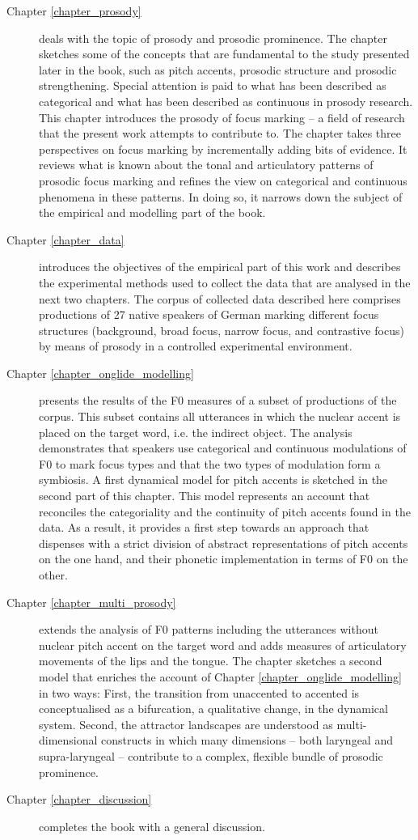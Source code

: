 \begin{description}
\item[Chapter \ref{chapter_prosody}] deals with the topic of prosody and prosodic prominence. The chapter sketches some of the concepts that are fundamental to the study presented later in the book, such as pitch accents, prosodic structure and prosodic strengthening. Special attention is paid to what has been described as categorical and what has been described as continuous in prosody research. This chapter introduces the prosody of focus marking -- a field of research that the present work attempts to contribute to. The chapter takes three perspectives on focus marking by incrementally adding bits of evidence. It reviews what is known about the tonal and articulatory patterns of prosodic focus marking and refines the view on categorical and continuous phenomena in these patterns. In doing so, it narrows down the subject of the empirical and modelling part of the book. 

\item[Chapter \ref{chapter_data}] introduces the objectives of the empirical part of this work and describes the experimental methods used to collect the data that are analysed in the next two chapters. The corpus of collected data described here comprises productions of 27 native speakers of German marking different focus structures (background, broad focus, narrow focus, and contrastive focus) by means of prosody in a controlled experimental environment.

\item[Chapter \ref{chapter_onglide_modelling}] presents the results of the F0 measures of a subset of productions of the corpus. This subset contains all utterances in which the nuclear accent is placed on the target word, i.e. the indirect object. The analysis demonstrates that speakers use categorical and continuous modulations of F0 to mark focus types and that the two types of modulation form a symbiosis. A first dynamical model for pitch accents is sketched in the second part of this chapter. This model represents an account that reconciles the categoriality and the continuity of pitch accents found in the data. As a result, it provides a first step towards an approach that dispenses with a strict division of abstract representations of pitch accents on the one hand, and their phonetic implementation in terms of F0 on the other.

\item[Chapter \ref{chapter_multi_prosody}] extends the analysis of F0 patterns including the utterances without nuclear pitch accent on the target word and adds measures of articulatory movements of the lips and the tongue. The chapter  sketches a second model that enriches the account of Chapter \ref{chapter_onglide_modelling} in two ways: First, the transition from unaccented to accented is conceptualised as a bifurcation, a qualitative change, in the dynamical system. Second, the attractor landscapes are understood as multi-dimensional constructs in which many dimensions -- both laryngeal and supra-laryngeal -- contribute to a complex, flexible bundle of prosodic prominence.

\item[Chapter \ref{chapter_discussion}] completes the book with a general discussion.

\end{description}
